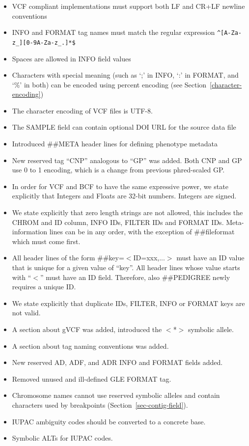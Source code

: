 \documentclass[8pt]{article}
\begin{document}
\begin{itemize}
\item VCF compliant implementations must support both LF and CR+LF newline conventions
\item INFO and FORMAT tag names must match the regular expression \texttt{\^{}[A-Za-z\_][0-9A-Za-z\_.]*\$}
\item Spaces are allowed in INFO field values
\item Characters with special meaning (such as `;' in INFO, `:' in FORMAT, and `\%' in both) can be encoded using percent encoding (see Section~\ref{character-encoding})
\item The character encoding of VCF files is UTF-8.
\item The SAMPLE field can contain optional DOI URL for the source data file
\item Introduced \#\#META header lines for defining phenotype metadata
\item New reserved tag ``CNP'' analogous to ``GP'' was added. Both CNP and GP use 0 to 1 encoding, which is a change from previous phred-scaled GP.
\item In order for VCF and BCF to have the same expressive power, we state explicitly that Integers and Floats are 32-bit numbers.
Integers are signed.
\item We state explicitly that zero length strings are not allowed, this includes the CHROM and ID column, INFO IDs, FILTER IDs and FORMAT IDs.
Meta-information lines can be in any order, with the exception of \#\#fileformat which must come first. 
\item All header  lines of the form \#\#key=$<$ID=xxx,...$>$ must have an ID value that is unique for a given value of ``key''.
All header lines whose value starts with ``$<$'' must have an ID field.
Therefore, also \#\#PEDIGREE newly requires a unique ID.
\item We state explicitly that duplicate IDs, FILTER, INFO or FORMAT keys are not valid.
\item A section about gVCF was added, introduced the $<$*$>$ symbolic allele.
\item A section about tag naming conventions was added.
\item New reserved AD, ADF, and ADR INFO and FORMAT fields added.
\item Removed unused and ill-defined GLE FORMAT tag.
\item Chromosome names cannot use reserved symbolic alleles and contain characters used by breakpoints (Section~\ref{sec-contig-field}).
\item IUPAC ambiguity codes should be converted to a concrete base.
\item Symbolic ALTs for IUPAC codes.
\end{itemize}
\end{document}
